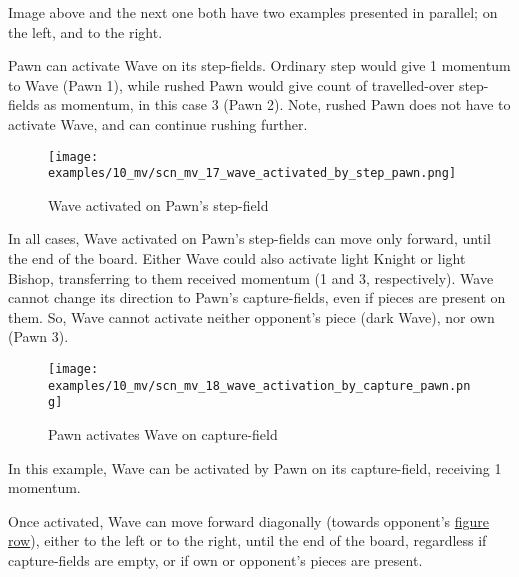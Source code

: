 \vspace*{-0.5\baselineskip}
Image above and the next one both have two examples presented in parallel; on the
left, and to the right.

Pawn can activate Wave on its step-fields. Ordinary step would give 1 momentum to
Wave (Pawn 1), while rushed Pawn would give count of travelled-over step-fields as
momentum, in this case 3 (Pawn 2). Note, rushed Pawn does not have to activate Wave,
and can continue rushing further.

\clearpage %

\vspace*{-2.1\baselineskip}
\noindent
\begin{figure}[!h]
\texttt{[image: examples/10\_mv/scn\_mv\_17\_wave\_activated\_by\_step\_pawn.png]}
\caption{Wave activated on Pawn's step-field}
\label{fig:scn_mv_17_wave_activated_by_step_pawn}
\end{figure}

In all cases, Wave activated on Pawn's step-fields can move only forward, until the end
of the board. Either Wave could also activate light Knight or light Bishop, transferring
to them received momentum (1 and 3, respectively). Wave cannot change its direction to
Pawn's capture-fields, even if pieces are present on them. So, Wave cannot activate neither
opponent's piece (dark Wave), nor own (Pawn 3).

\clearpage %

\vspace*{-2.1\baselineskip}
\noindent
\begin{figure}[!h]
\texttt{[image: examples/10\_mv/scn\_mv\_18\_wave\_activation\_by\_capture\_pawn.png]}
\caption{Pawn activates Wave on capture-field}
\label{fig:scn_mv_18_wave_activation_by_capture_pawn}
\end{figure}

In this example, Wave can be activated by Pawn on its capture-field, receiving 1 momentum.

Once activated, Wave can move forward diagonally (towards opponent's
\hyperref[sec:Terms/Figure row]{figure row}), either to the left or to the right, until the
end of the board, regardless if capture-fields are empty, or if own or opponent's pieces are
present.

\clearpage %

